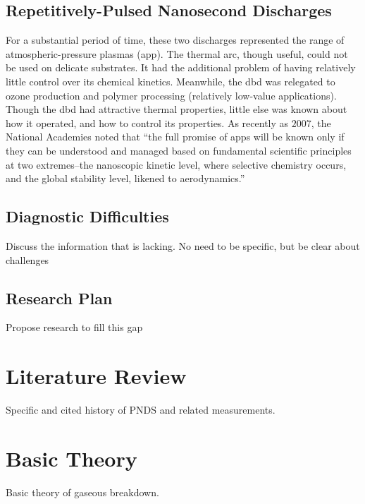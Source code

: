 \subsection{Repetitively-Pulsed Nanosecond Discharges}
For a substantial period of time, these two discharges represented the range of
atmospheric-pressure plasmas (\acs{app}). The thermal arc, though useful, could
not be used on delicate substrates. It had the additional problem of having
relatively little control over its chemical kinetics. Meanwhile, the \acs{dbd}
was relegated to ozone production and polymer processing (relatively low-value
applications). Though the \acs{dbd} had attractive thermal properties, little
else was known about how it operated, and how to control its properties. As
recently as $2007$, the National Academies noted that ``the full promise of
\acs{app}s will be known only if they can be understood and managed based on
fundamental scientific principles at two extremes--the nanoscopic kinetic level,
where selective chemistry occurs, and the global stability level, likened to
aerodynamics.''




\subsection{Diagnostic Difficulties}

Discuss the information that is lacking. No need to be specific, but be clear
about challenges

\subsection{Research Plan}

Propose research to fill this gap

\section{Literature Review}

Specific and cited history of PNDS and related measurements.

\section{Basic Theory}

Basic theory of gaseous breakdown.
